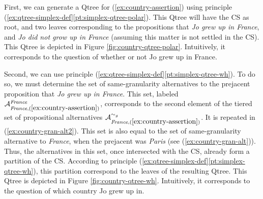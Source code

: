 \begin{exe}
	\label{ex:country-tiered-alt}
\end{exe} 


First, we can generate a Qtree for (\ref{ex:country-assertion}) using principle (\ref{ex:qtree-simplex-def}\ref{pt:simplex-qtree-polar}). This Qtree will have the CS as root, and two leaves corresponding to the propositions that \textit{Jo grew up in France}, and \textit{Jo did not grow up in France} (assuming this matter is not settled in the CS). This Qtree is depicted in Figure \ref{fig:country-qtree-polar}. Intuitively, it corresponds to the question of whether or not Jo grew up in France.

Second, we can use principle (\ref{ex:qtree-simplex-def}\ref{pt:simplex-qtree-wh}). To do so, we must determine the set of same-granularity alternatives to the prejacent proposition that \textit{Jo grew up in France}. This set, labeled $\mathcal{A}_{\textit{France}, (\ref{ex:country-assertion})}^{\textit{France}}$, corresponds to the second element of the tiered set of propositional alternatives $\mathcal{A}_{\textit{France}, (\ref{ex:country-assertion})}^{\sim_g}$. It is repeated in (\ref{ex:country-gran-alt2}). This set is also equal to the set of same-granularity alternative to \textit{France}, when the prejacent was \textit{Paris} (see (\ref{ex:country-gran-alt})). Thus, the alternatives in this set, once intersected with the CS, already form a partition of the CS. According to principle (\ref{ex:qtree-simplex-def}\ref{pt:simplex-qtree-wh}), this partition correspond to the leaves of the resulting Qtree. This Qtree is depicted in Figure \ref{fig:country-qtree-wh}. Intuitively, it corresponds to the question of which country Jo grew up in.


